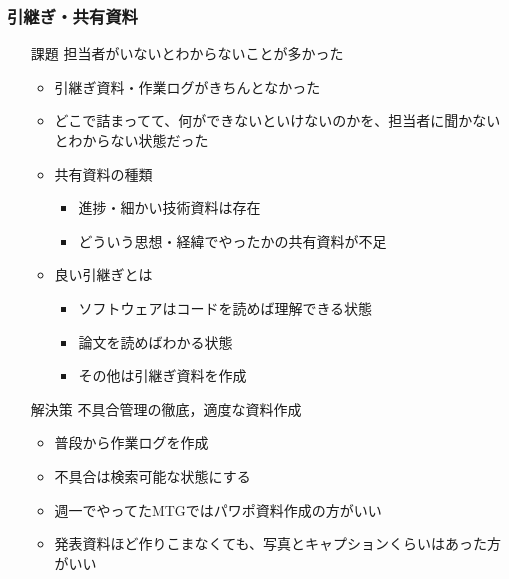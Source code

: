 \subsubsection*{引継ぎ・共有資料}
\begin{itemize}
	\item[課題] 担当者がいないとわからないことが多かった
	\begin{itemize}
		\item 引継ぎ資料・作業ログがきちんとなかった
		\item どこで詰まってて、何ができないといけないのかを、担当者に聞かないとわからない状態だった
		\item 共有資料の種類
		\begin{itemize}
			\item 進捗・細かい技術資料は存在
			\item どういう思想・経緯でやったかの共有資料が不足
		\end{itemize}
		
		\item 良い引継ぎとは
		\begin{itemize}
			\item ソフトウェアはコードを読めば理解できる状態
			\item 論文を読めばわかる状態
			\item その他は引継ぎ資料を作成
		\end{itemize}		
	\end{itemize}
	\item[解決策] 不具合管理の徹底，適度な資料作成
		\begin{itemize}
			\item 普段から作業ログを作成
			\item 不具合は検索可能な状態にする
			\item 週一でやってたMTGではパワポ資料作成の方がいい
			\item 発表資料ほど作りこまなくても、写真とキャプションくらいはあった方がいい
		\end{itemize}

\end{itemize}


